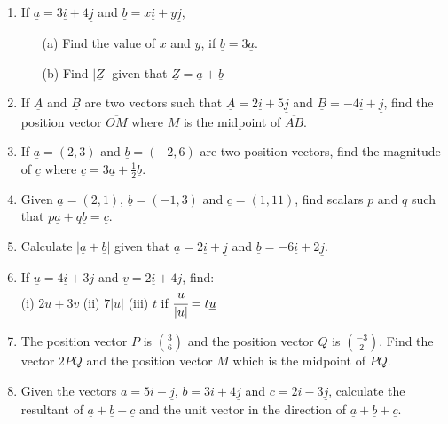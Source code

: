 \begin{enumerate}
	\item If $\underline{a} = 3\underline{i} + 4\underline{j}$ and $\underline{b} = x\underline{i} + y\underline{j}$, 
		\begin{itemize}
		\item[(a)] Find the value of $x$ and $y$, if $\underline{b} = 3\underline{a}$.
		\item[(b)] Find $|\underline{Z}|$ given that $\underline{Z} = \underline{a} + \underline{b}$
		\end{itemize}
		
	\item If $\underline{A}$ and $\underline{B}$ are two vectors such that $\underline{A} = 2\underline{i} + 5\underline{j}$ and $\underline{B} = -4\underline{i} + \underline{j}$, find the position vector $\overline{OM}$ where $M$ is the midpoint of $\overline{AB}$.
	
	\item If $\underline{a} = (2,3)$ and $\underline{b} = (-2,6)$ are two position vectors, find the magnitude of $\underline{c}$ where $\underline{c} = 3\underline{a} + \frac{1}{2}\underline{b}$.
	
	\item Given $\underline{a} = (2,1)$, $\underline{b} = (-1,3)$ and $\underline{c} = (1,11)$, find scalars $p$ and $q$ such that $p\underline{a} + q\underline{b} = \underline{c}$.
	
	\item Calculate $|\underline{a} + \underline{b}|$ given that $\underline{a} = 2\underline{i} + \underline{j}$ and $\underline{b} = -6\underline{i} + 2\underline{j}$.
	
	\item If $\underline{u} = 4\underline{i} + 3\underline{j}$ and $\underline{v} = 2\underline{i} + 4\underline{j}$, find:\\
	(i) $2\underline{u} + 3\underline{v}$ \quad (ii) $7|\underline{u}|$ \quad (iii) $t$ if $\cfrac{u}{|u|} = t\underline{u}$
	
	\item The position vector $P$ is $\binom{3}{6}$ and the position vector $Q$ is $\binom{-3}{2}$. Find the vector $2PQ$ and the position vector $M$ which is the midpoint of $PQ$.
	
	\item Given the vectors $\underline{a} = 5\underline{i} - \underline{j}$, $\underline{b} = 3\underline{i} + 4\underline{j}$ and $\underline{c} = 2\underline{i} - 3\underline{j}$, calculate the resultant of $\underline{a} + \underline{b} + \underline{c}$ and the unit vector in the direction of $\underline{a} + \underline{b} + \underline{c}$.
	

\end{enumerate}
